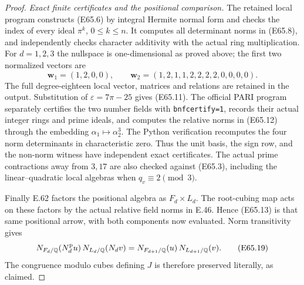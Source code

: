 \begin{proof}
\emph{Exact finite certificates and the positional comparison.}
The retained local program constructs (E65.6) by integral Hermite
normal form and checks the index of every ideal $\pi^k$, $0\le k\le n$.
It computes all determinant norms in (E65.8), and independently
checks character additivity with the actual ring multiplication.
For $d=1,2,3$ the nullspace is one-dimensional as proved above;
the first two normalized vectors are
\[
 \mathbf w_1=(1,2,0,0),\qquad
 \mathbf w_2=(1,2,1,1,2,2,2,2,0,0,0,0).
 \tag{E65.18}
\]
The full degree-eighteen local vector, matrices and relations
are retained in the output. Substitution of
$\varepsilon=7\pi-25$ gives (E65.11).
The official PARI program separately certifies the two number fields
with \texttt{bnfcertify=1}, records their actual integer rings and
prime ideals, and computes the relative norms in (E65.12) through
the embedding $\alpha_1\mapsto\alpha_2^3$.
The Python verification recomputes the four norm determinants in
characteristic zero. Thus the unit basis, the sign row, and the
non-norm witness have independent exact certificates.
The actual prime contractions away from $3,17$ are also checked
against (E65.3), including the linear--quadratic local algebras when
$q_v\equiv2\pmod3$.

Finally E.62 factors the positional algebra as $F_d\times L_d$.
The root-cubing map acts on these factors by the actual relative
field norms in E.46. Hence (E65.13) is that same positional arrow,
with both components now evaluated.
Norm transitivity gives
\[
 N_{F_d/\mathbb Q}(N_d^{\rm p}u)\,
 N_{L_d/\mathbb Q}(N_d v)
   =N_{F_{d+1}/\mathbb Q}(u)\,
      N_{L_{d+1}/\mathbb Q}(v).
 \tag{E65.19}
\]
The congruence modulo cubes defining $J$ is therefore preserved
literally, as claimed.
\end{proof}
